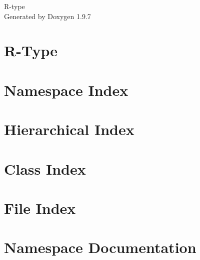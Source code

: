 \documentclass[twoside]{book}
\newcommand{\+}{\discretionary{\mbox{\scriptsize$\hookleftarrow$}}{}{}}
\newcommand{\clearemptydoublepage}{%
    \newpage{\pagestyle{empty}\cleardoublepage}%
  }
\begin{document}
  \raggedbottom
    \hypersetup{pageanchor=false,
                bookmarksnumbered=true,
                pdfencoding=unicode
               }
  \begin{titlepage}
  \vspace*{7cm}
  \begin{center}%
  {\Large R-\/type}\\
  \vspace*{1cm}
  {\large Generated by Doxygen 1.9.7}\\
  \end{center}
  \end{titlepage}
  \clearemptydoublepage
  \tableofcontents
  \clearemptydoublepage
  \hypersetup{pageanchor=true}
\chapter{R-\/\+Type}
\label{md__2home_2mbonnet_2TEK3_2B-CPP-500-REN-5-2-rtype-oceane_8krull_2README}

\chapter{Namespace Index}

\chapter{Hierarchical Index}

\chapter{Class Index}

\chapter{File Index}

\chapter{Namespace Documentation}





\end{document}
